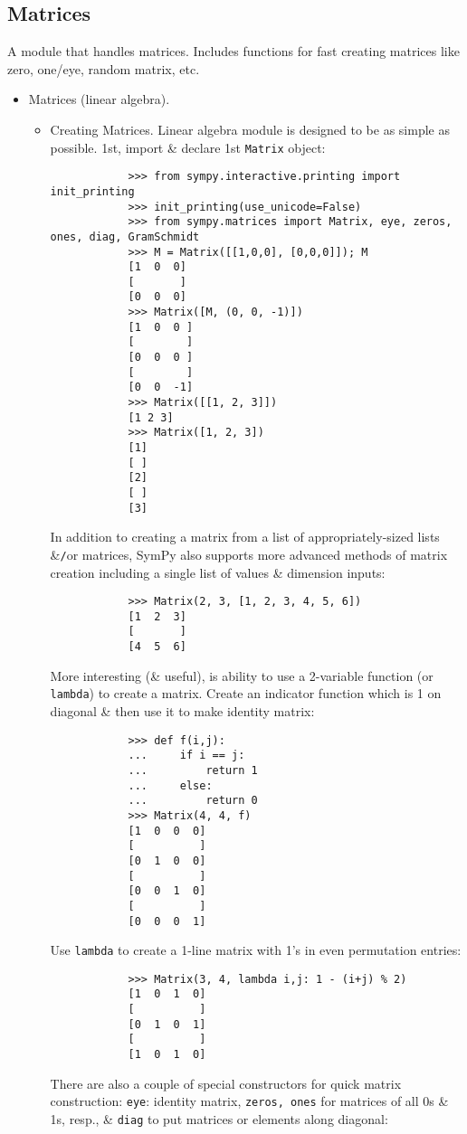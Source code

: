 \documentclass{article}
\begin{document}
\subsection{Matrices}
A module that handles matrices. Includes functions for fast creating matrices like zero, one/eye, random matrix, etc.
\begin{itemize}
	\item {\sf Matrices (linear algebra).}
	\begin{itemize}
		\item {\sf Creating Matrices.} Linear algebra module is designed to be as simple as possible. 1st, import \& declare 1st {\tt Matrix} object:
		\begin{verbatim}
			>>> from sympy.interactive.printing import init_printing
			>>> init_printing(use_unicode=False)
			>>> from sympy.matrices import Matrix, eye, zeros, ones, diag, GramSchmidt
			>>> M = Matrix([[1,0,0], [0,0,0]]); M
			[1  0  0]
			[       ]
			[0  0  0]
			>>> Matrix([M, (0, 0, -1)])
			[1  0  0 ]
			[        ]
			[0  0  0 ]
			[        ]
			[0  0  -1]
			>>> Matrix([[1, 2, 3]])
			[1 2 3]
			>>> Matrix([1, 2, 3])
			[1]
			[ ]
			[2]
			[ ]
			[3]
		\end{verbatim}
		In addition to creating a matrix from a list of appropriately-sized lists \&{\tt/}or matrices, SymPy also supports more advanced methods of matrix creation including a single list of values \& dimension inputs:
		\begin{verbatim}
			>>> Matrix(2, 3, [1, 2, 3, 4, 5, 6])
			[1  2  3]
			[       ]
			[4  5  6]
		\end{verbatim}
		More interesting (\& useful), is ability to use a 2-variable function (or {\tt lambda}) to create a matrix. Create an indicator function which is 1 on diagonal \& then use it to make identity matrix:
		\begin{verbatim}
			>>> def f(i,j):
			...     if i == j:
			...         return 1
			...     else:
			...         return 0
			>>> Matrix(4, 4, f)
			[1  0  0  0]
			[          ]
			[0  1  0  0]
			[          ]
			[0  0  1  0]
			[          ]
			[0  0  0  1]
		\end{verbatim}
		Use {\tt lambda} to create a 1-line matrix with 1's in even permutation entries:
		\begin{verbatim}
			>>> Matrix(3, 4, lambda i,j: 1 - (i+j) % 2)
			[1  0  1  0]
			[          ]
			[0  1  0  1]
			[          ]
			[1  0  1  0]
		\end{verbatim}
		There are also a couple of special constructors for quick matrix construction: {\tt eye}: identity matrix, {\tt zeros, ones} for matrices of all 0s \& 1s, resp., \& {\tt diag} to put matrices or elements along diagonal:

\end{itemize}
\end{itemize}
\end{document}
